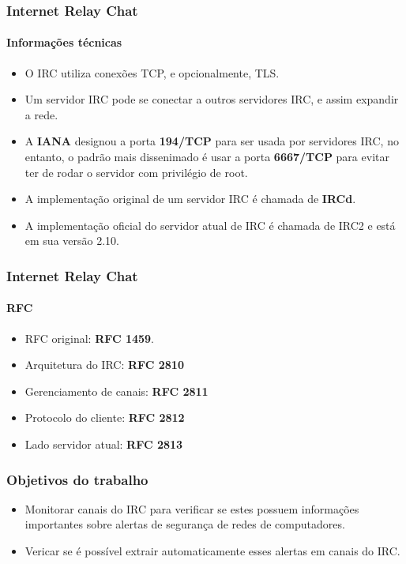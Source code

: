 \documentclass{beamer}
\begin{document}
\begin{frame}
\frametitle{Internet Relay Chat}
\framesubtitle{Informações técnicas}

  \begin{itemize}
    \item O IRC utiliza conexões TCP, e opcionalmente, TLS.
    \item Um servidor IRC pode se conectar a outros servidores IRC, e assim
    expandir a rede.
    \item A \textbf{IANA} designou a porta \textbf{194/TCP} para ser usada por
     servidores IRC, no entanto, o padrão mais dissenimado é usar a porta
     \textbf{6667/TCP} para evitar ter de rodar o servidor com privilégio de
     root.
    \item A implementação original de um servidor IRC é chamada de
    \textbf{IRCd}.
    \item A implementação oficial do servidor atual de IRC é chamada de IRC2
    e está em sua versão 2.10.
  \end{itemize}

\end{frame}

\begin{frame}
\frametitle{Internet Relay Chat}
\framesubtitle{RFC}

  \begin{itemize}
    \setlength\itemsep{1em}
    \item RFC original: \textbf{RFC 1459}.
    \item Arquitetura do IRC: \textbf{RFC 2810}
    \item Gerenciamento de canais: \textbf{RFC 2811}
    \item Protocolo do cliente: \textbf{RFC 2812}
    \item Lado servidor atual: \textbf{RFC 2813}
  \end{itemize}

\end{frame}



\begin{frame}
\frametitle{Objetivos do trabalho}

\begin{itemize}
    \setlength\itemsep{1.5em}
    \item Monitorar canais do IRC para verificar se estes possuem informações
    importantes sobre alertas de segurança de redes de computadores.
    \item Vericar se é possível extrair automaticamente esses alertas em canais
    do IRC.
\end{itemize}

\end{frame}
\end{document}

